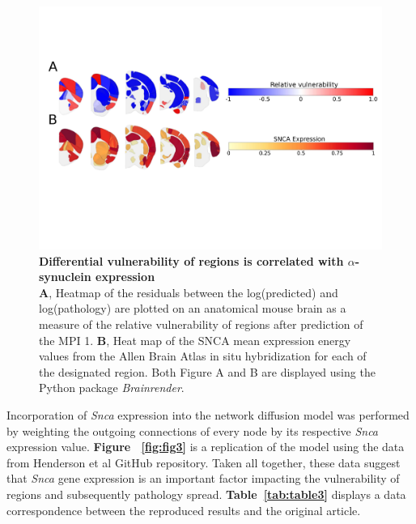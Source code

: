 \begin{figure}

    \includegraphics[width= \linewidth]{Figures/Fig2.pdf}
    \centering
    \caption{\textbf{Differential vulnerability of regions is correlated with $\alpha$-synuclein expression} \\
    \label{fig:fig2}
    \textbf{A}, Heatmap of the residuals between the log(predicted) and log(pathology) are plotted on an anatomical mouse brain as a measure of the relative vulnerability of regions after prediction of the MPI 1.
    \textbf{B}, Heat map of the SNCA mean expression energy values from the Allen Brain Atlas in situ hybridization for each of the designated region.
    Both Figure A and B are displayed using the Python package \textit{Brainrender}. \cite{Claudi_2021}}
\end{figure}
    
Incorporation of \textit{Snca} expression into the network diffusion model was performed by weighting the outgoing connections of every node by its respective \textit{Snca} expression value. \textbf{Figure ~\ref{fig:fig3}} is a replication of the model using the data from Henderson et al GitHub repository. Taken all together, these data suggest that \textit{Snca} gene expression is an important factor impacting the vulnerability of regions and subsequently pathology spread. \textbf{Table~\ref{tab:table3}} displays a data correspondence between the reproduced results and the original article.

